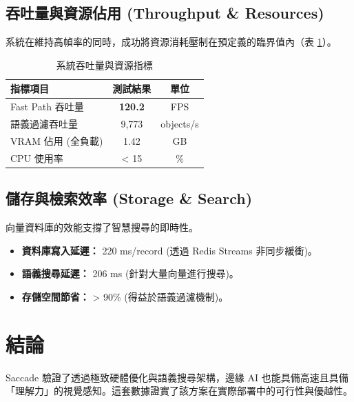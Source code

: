 \documentclass[journal, 10pt, twocolumn]{IEEEtran}
\begin{document}
\subsection{吞吐量與資源佔用 (Throughput \& Resources)}
系統在維持高幀率的同時，成功將資源消耗壓制在預定義的臨界值內（表 \ref{tab:resources}）。
\begin{table}[h]
\caption{系統吞吐量與資源指標}
\label{tab:resources}
\centering
\begin{tabular}{@{}lcc@{}}
\toprule
指標項目 & 測試結果 & 單位 \\ \midrule
Fast Path 吞吐量 & \textbf{120.2} & FPS \\
語義過濾吞吐量 & 9,773 & objects/s \\
VRAM 佔用 (全負載) & 1.42 & GB \\
CPU 使用率 & < 15 & \% \\ \bottomrule
\end{tabular}
\end{table}

\subsection{儲存與檢索效率 (Storage \& Search)}
向量資料庫的效能支撐了智慧搜尋的即時性。
\begin{itemize}
    \item \textbf{資料庫寫入延遲：} 220 ms/record (透過 Redis Streams 非同步緩衝)。
    \item \textbf{語義搜尋延遲：} 206 ms (針對大量向量進行搜尋)。
    \item \textbf{存儲空間節省：} > 90\% (得益於語義過濾機制)。
\end{itemize}

\section{結論}
Saccade 驗證了透過極致硬體優化與語義搜尋架構，邊緣 AI 也能具備高速且具備「理解力」的視覺感知。這套數據證實了該方案在實際部署中的可行性與優越性。
\end{document}
